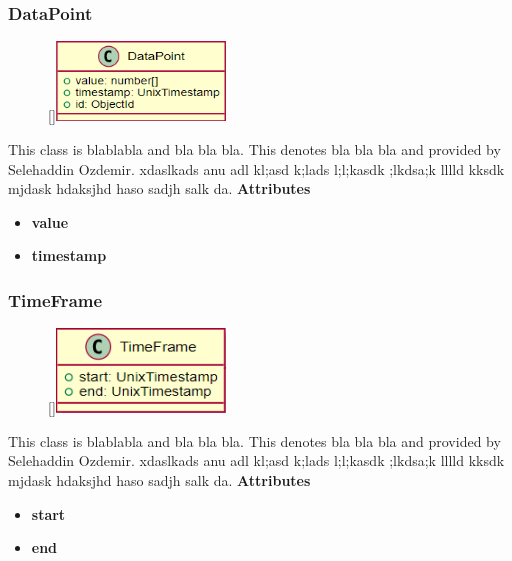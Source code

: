 \subsubsection{DataPoint}
\label{DataPoint}
\begin{figure}
    \raisebox{0pt}[\dimexpr{}\baselineskip\relax]{\includegraphics[width=4.5cm]{classes/workspace-management/9.png}}
\end{figure} 
\par
This class is blablabla and bla bla bla. This denotes bla bla bla and provided by Selehaddin Ozdemir. xdaslkads anu adl kl;asd k;lads l;l;kasdk ;lkdsa;k lllld kksdk mjdask hdaksjhd haso sadjh salk da.
\newline
\newline
\textbf{Attributes}
\begin{itemize}
    \item \textbf{value}
    \item \textbf{timestamp}
\end{itemize}

\subsubsection{TimeFrame}
\label{TimeFrame}
\begin{figure}
    \raisebox{0pt}[\dimexpr{}\baselineskip\relax]{\includegraphics[width=4.5cm]{classes/workspace-management/10.png}}
\end{figure} 
\par
This class is blablabla and bla bla bla. This denotes bla bla bla and provided by Selehaddin Ozdemir. xdaslkads anu adl kl;asd k;lads l;l;kasdk ;lkdsa;k lllld kksdk mjdask hdaksjhd haso sadjh salk da.
\newline
\newline
\textbf{Attributes}
\begin{itemize}
    \item \textbf{start}
    \item \textbf{end}
\end{itemize}

